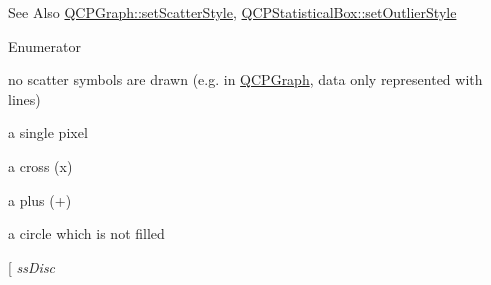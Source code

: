 \begin{DoxySeeAlso}{See Also}
\hyperlink{classQCPGraph_a06373e09547bcfe237dd8ebcbe5c255a}{Q\-C\-P\-Graph\-::set\-Scatter\-Style}, \hyperlink{classQCPStatisticalBox_a1cb2469552f6f6615b1f6d7398463e5c}{Q\-C\-P\-Statistical\-Box\-::set\-Outlier\-Style} 
\end{DoxySeeAlso}
\begin{Desc}
\item[Enumerator]\par
\begin{description}
\item[{\em 
\hypertarget{namespaceQCP_af66d0711d42fe78d96c28abadc67f26fa3ee9f603bc4623e9b98011e8829aad1d}{ss\-None}\label{namespaceQCP_af66d0711d42fe78d96c28abadc67f26fa3ee9f603bc4623e9b98011e8829aad1d}
}]no scatter symbols are drawn (e.\-g. in \hyperlink{classQCPGraph}{Q\-C\-P\-Graph}, data only represented with lines) \item[{\em 
\hypertarget{namespaceQCP_af66d0711d42fe78d96c28abadc67f26fa56816c1386f1356417bcc013adf0367c}{ss\-Dot}\label{namespaceQCP_af66d0711d42fe78d96c28abadc67f26fa56816c1386f1356417bcc013adf0367c}
}]a single pixel \item[{\em 
\hypertarget{namespaceQCP_af66d0711d42fe78d96c28abadc67f26fab1d52c10ee4b09fe17854be238055f30}{ss\-Cross}\label{namespaceQCP_af66d0711d42fe78d96c28abadc67f26fab1d52c10ee4b09fe17854be238055f30}
}]a cross (x) \item[{\em 
\hypertarget{namespaceQCP_af66d0711d42fe78d96c28abadc67f26fa82b8526e3bfa7d0cccc1fd5eb16505ac}{ss\-Plus}\label{namespaceQCP_af66d0711d42fe78d96c28abadc67f26fa82b8526e3bfa7d0cccc1fd5eb16505ac}
}]a plus (+) \item[{\em 
\hypertarget{namespaceQCP_af66d0711d42fe78d96c28abadc67f26fa13ed43d724ecefa84baae4179de3bd8d}{ss\-Circle}\label{namespaceQCP_af66d0711d42fe78d96c28abadc67f26fa13ed43d724ecefa84baae4179de3bd8d}
}]a circle which is not filled \item[{\em 
\hypertarget{namespaceQCP_af66d0711d42fe78d96c28abadc67f26fa6d1fd37ccd5f6fdea72992feb522a342}{ss\-Disc}\label{namespaceQCP_af66d0711d42fe78d96c28abadc67f26fa6d1fd37ccd5f6fdea72992feb522a342}
}
\end{description}
\end{Desc}
